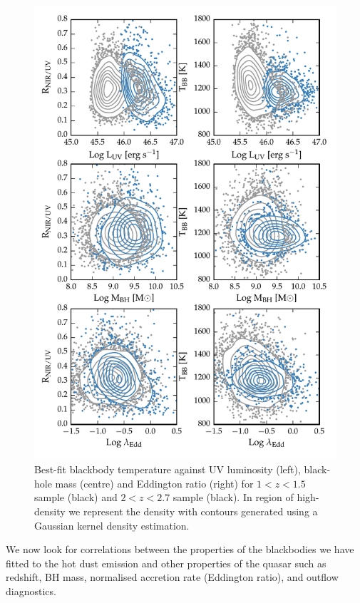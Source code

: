 \begin{figure}
  \centering
  \includegraphics[width=\textwidth]{figures/chapter05/correlations_contour.pdf}
  \caption[{Best-fit blackbody temperature against UV luminosity, black-hole mass and Eddington ratio.}]{Best-fit blackbody temperature against UV luminosity (left), black-hole mass (centre) and Eddington ratio (right) for $1 < z < 1.5$ sample (black) and $2 < z < 2.7$ sample (black). In region of high-density we represent the density with contours generated using a Gaussian kernel density estimation.  }
  \label{fig:correlations_contour}
\end{figure}

We now look for correlations between the properties of the blackbodies we have fitted to the hot dust emission and other properties of the quasar such as redshift, BH mass, normalised accretion rate (Eddington ratio), and outflow diagnostics.  

